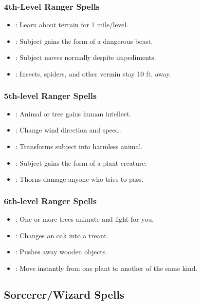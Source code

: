 \subsubsection{4th-Level Ranger Spells}
\begin{itemize}
\item {}: Learn about terrain for 1 mile/level.
\item {}: Subject gains the form of a dangerous beast.
\item {}: Subject moves normally despite impediments.
\item {}: Insects, spiders, and other vermin stay 10 ft. away.
\end{itemize}
\subsubsection{5th-level Ranger Spells}
\begin{itemize}
\item {}: Animal or tree gains human intellect.
\item {}: Change wind direction and speed.
\item {}: Transforms subject into harmless animal.
\item {}: Subject gains the form of a plant creature.
\item {}: Thorns damage anyone who tries to pass.
\end{itemize}
\subsubsection{6th-level Ranger Spells}
\begin{itemize}
\item {}: One or more trees animate and fight for you.
\item {}: Changes an oak into a treant.
\item {}: Pushes away wooden objects.
\item {}: Move instantly from one plant to another of the same kind.
\end{itemize}
\subsection{Sorcerer/Wizard Spells}
